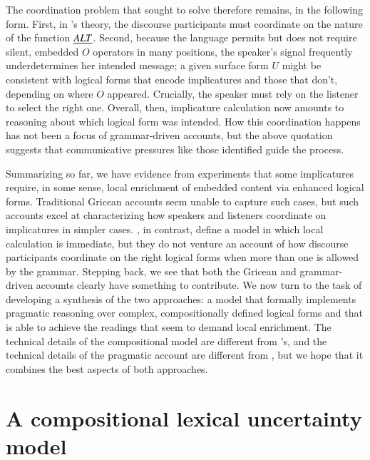 \documentclass[leqno,12pt]{article}
\begin{document}
The coordination problem that \citeauthor{Grice75} sought to solve
therefore remains, in the following form. First, in \CFS's theory, the
discourse participants must coordinate on the nature of the
function $\emph{ALT}$.  Second, because the language permits but does not
require silent, embedded $O$ operators in many positions, the
speaker's signal frequently underdetermines her intended message; a
given surface form $U$ might be consistent with logical forms that
encode implicatures and those that don't, depending on where $O$
appeared. Crucially, the speaker must rely on the listener to select
the right one.  Overall, then, implicature calculation now amounts to
reasoning about which logical form was intended. How this coordination
happens has not been a focus of grammar-driven accounts, but the above
quotation suggests that communicative pressures like those
\citeauthor{Grice75} identified guide the process.

Summarizing so far, we have evidence from
 experiments that some implicatures
require, in some sense, local enrichment of embedded content via
enhanced logical forms. Traditional Gricean accounts seem unable to
capture such cases, but such accounts excel at characterizing how
speakers and listeners coordinate on implicatures in simpler
cases. \CFS, in contrast, define a model in which local calculation is
immediate, but they do not venture an account of how discourse
participants coordinate on the right logical forms when more than one
is allowed by the grammar. Stepping back, we see that both the Gricean
and grammar-driven accounts clearly have something to contribute. We
now turn to the task of developing a synthesis of the two approaches:
a model that formally implements pragmatic reasoning over complex,
compositionally defined logical forms and that is able to achieve the
readings that seem to demand local enrichment. The technical details
of the compositional model are different from \CFS's, and the
technical details of the pragmatic account are different from
\citeauthor{Grice75}, but we hope that it combines the best aspects of
both approaches.


\section{A compositional lexical uncertainty model}\label{sec:model}

\end{document}
